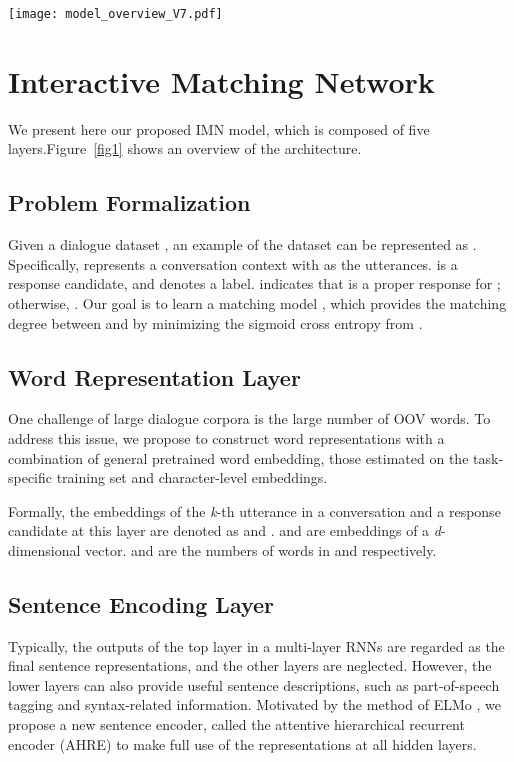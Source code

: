 \documentclass[sigconf]{acmart}
\begin{document}
  \begin{figure*}
    \centering
    \texttt{[image: model\_overview\_V7.pdf]}
    \caption{An overview of our proposed IMN model.}
    \label{fig1}
  \end{figure*}


\section{Interactive Matching Network}

  We present here our proposed IMN model, which is composed of five layers.Figure~\ref{fig1} shows an overview of the architecture. 

  \subsection{Problem Formalization}
    Given a dialogue dataset , an example of the dataset can be represented as . Specifically,  represents a conversation context with  as the utterances.  is a response candidate, and  denotes a label.  indicates that  is a proper response for ; otherwise, . Our goal is to learn a matching model , which provides the matching degree between  and  by minimizing the sigmoid cross entropy from .


  \subsection{Word Representation Layer}

    One challenge of large dialogue corpora is the large number of OOV words. To address this issue, we propose to construct word representations with a combination of general pretrained word embedding, those estimated on the task-specific training set and character-level embeddings. 

    Formally, the embeddings of the \emph{k}-th utterance in a conversation and a response candidate at this layer are denoted as  and .  and  are embeddings of a \emph{d}-dimensional vector.  and  are the numbers of words in  and  respectively.

  \subsection{Sentence Encoding Layer}

    Typically, the outputs of the top layer in a multi-layer RNNs are regarded as the final sentence representations, and the other layers are neglected. However, the lower layers can also provide useful sentence descriptions, such as part-of-speech tagging and syntax-related information. Motivated by the method of ELMo \cite{DBLP:conf/naacl/PetersNIGCLZ18}, we propose a new sentence encoder, called the attentive hierarchical recurrent encoder (AHRE) to make full use of the representations at all hidden layers.
\end{document}
